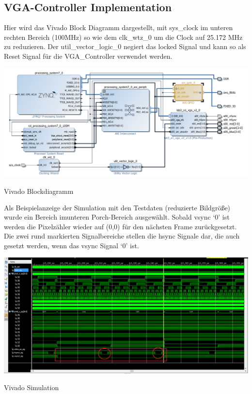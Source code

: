 \subsection{VGA-Controller Implementation}
Hier wird das Vivado Block Diagramm dargestellt, mit sys\_clock im unteren rechten Bereich (100MHz) so wie dem clk\_wtz\_0 um 
die Clock auf 25.172 MHz zu reduzieren. Der util\_vector\_logic\_0 negiert das locked Signal und kann so als Reset Signal für die VGA\_Controller verwendet werden.\\

\begin{minipage}{\textwidth}
    \begin{center}        
        \includegraphics[scale=0.5]{img/block_a2-switches.png} 
    \end{center}
\end{minipage}
\begin{center}
Vivado Blockdiagramm
\end{center}

Als Beispielanzeige der Simulation mit den Testdaten (reduzierte Bildgröße) wurde ein  Bereich imunteren Porch-Bereich ausgewählt. Sobald vsync `0' ist werden die Pixelzähler wieder auf (0,0) für den nächsten Frame zurückgesetzt. Die zwei rund markierten Signalbereiche stellen die hsync Signale dar, die auch gesetzt werden, wenn das vsync Signal `0' ist. \\

\begin{minipage}{\textwidth}
    \begin{center}        
        \includegraphics[scale=0.4]{img/hvsync.png} 
    \end{center}
\end{minipage}
\begin{center}
Vivado Simulation
\end{center}

